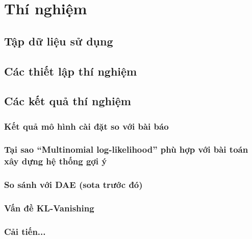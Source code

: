 \chapter{Thí nghiệm}
\label{Chapter4}

\section{Tập dữ liệu sử dụng}
\section{Các thiết lập thí nghiệm}
\section{Các kết quả thí nghiệm}
    \subsection{Kết quả mô hình cài đặt so với bài báo}
    \subsection{Tại sao ``Multinomial log-likelihood'' phù hợp với bài toán xây dựng hệ thống gợi ý}
    \subsection{So sánh với DAE (sota trước đó)}
    \subsection{Vấn đề KL-Vanishing}
    \subsection{Cải tiến...}